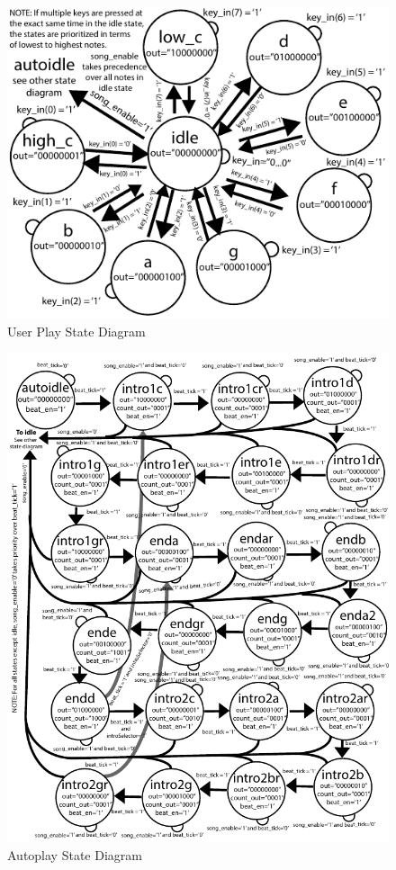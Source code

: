 \documentclass{article}
\begin{document}
	      \begin{figure}[H]
	        \centering
	        \includegraphics[width=6in]{img/UserStateDiagram}
	        \caption{User Play State Diagram}
	      \end{figure}
	      \newpage
	      \begin{figure}[H]
	        \centering
	        \includegraphics[width=6.5in]{img/AutoplayStateDiagram}
	        \caption{Autoplay State Diagram}
	      \end{figure}
\end{document}
